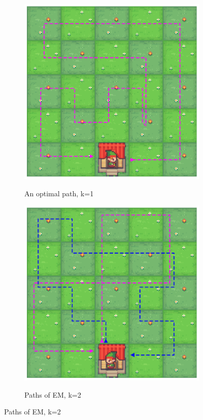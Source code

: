 \documentclass[letterpaper]{article} %
\begin{document}
\begin{figure}[t]
\begin{center}
    \begin{subfigure}{0.5\linewidth}
        \centering
        \caption{An optimal path, k=1}
        \includegraphics[width=\linewidth]{pics/paths/k=1.png}
        \label{fig:results_resource_k=1}
    \end{subfigure}%
    \hfill%
    \begin{subfigure}{0.5\linewidth}
        \centering
        \caption{Paths of EM, k=2}
        \includegraphics[width=\linewidth]{pics/paths/k=2.png}
        \label{fig:results_resource_k=2}
    \end{subfigure}


\end{center}
\end{figure}
\end{document}

